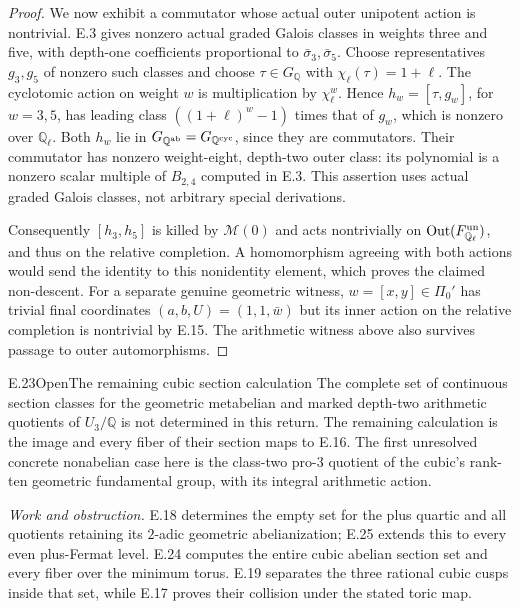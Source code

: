 \begin{proof}
We now exhibit a commutator whose actual outer unipotent action is
nontrivial. E.3 gives nonzero actual graded Galois classes in
weights three and five, with depth-one coefficients proportional
to $\bar\sigma_3,\bar\sigma_5$. Choose representatives $g_3,g_5$
of nonzero such classes and choose $\tau\in G_{\mathbb Q}$ with
$\chi_\ell(\tau)=1+\ell$. The cyclotomic action on weight $w$
is multiplication by $\chi_\ell^w$. Hence
$h_w=[\tau,g_w]$, for $w=3,5$, has leading class
$((1+\ell)^w-1)$ times that of $g_w$, which is nonzero over
$\mathbb Q_\ell$. Both $h_w$ lie in
$G_{\mathbb Q^{\rm ab}}=G_{\mathbb Q^{\rm cyc}}$, since they
are commutators. Their commutator has nonzero weight-eight,
depth-two outer class: its polynomial is a nonzero scalar multiple
of $B_{2,4}$ computed in E.3. This assertion uses actual graded
Galois classes, not arbitrary special derivations.

Consequently $[h_3,h_5]$ is killed by $\mathcal M(0)$ and acts
nontrivially on $\operatorname{Out}(F^{\rm un}_{\mathbb Q_\ell})$,
and thus on the relative completion. A homomorphism agreeing with
both actions would send the identity to this nonidentity element,
which proves the claimed non-descent. For a separate genuine
geometric witness, $w=[x,y]\in\Pi_0'$ has trivial final coordinates
$(a,b,U)=(1,1,\bar w)$ but its inner action on the relative
completion is nontrivial by E.15. The arithmetic witness above
also survives passage to outer automorphisms.
\end{proof}

\begin{statement}{E.23}{Open}{The remaining cubic section calculation}
The complete set of continuous section classes for the geometric
metabelian and marked depth-two arithmetic quotients of
$U_3/\mathbb Q$ is not determined in this return. The remaining
calculation is the image and every fiber of their section maps
to E.16. The first unresolved concrete nonabelian case here is
the class-two pro-$3$ quotient of the cubic's rank-ten geometric
fundamental group, with its integral arithmetic action.
\end{statement}
\noindent\emph{Work and obstruction.}
E.18 determines the empty set for the plus quartic and all
quotients retaining its $2$-adic geometric abelianization;
E.25 extends this to every even plus-Fermat level. E.24 computes
the entire cubic abelian section set and every fiber over the
minimum torus. E.19 separates the three rational cubic cusps
inside that set, while E.17 proves their collision under the
stated toric map.

